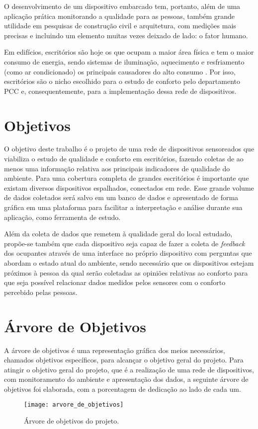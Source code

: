 \documentclass[../monografia.tex]{subfiles}
\begin{document}
O desenvolvimento de um dispositivo embarcado tem, portanto, além de uma aplicação prática monitorando a qualidade para as pessoas, também grande utilidade em pesquisas de construção civil e arquitetura, com medições mais precisas e incluindo um elemento muitas vezes deixado de lado: o fator humano.

Em edifícios, escritórios são hoje os que ocupam a maior área física e tem o maior consumo de energia, sendo sistemas de iluminação, aquecimento e resfriamento (como ar condicionado) os principais causadores do alto consumo \cite{EnergyBuildings}. Por isso, escritórios são o nicho escolhido para o estudo de conforto pelo departamento PCC e, consequentemente, para a implementação dessa rede de dispositivos. 


\section{Objetivos}

O objetivo deste trabalho é o projeto de uma rede de dispositivos sensoreados que viabiliza o estudo de qualidade e conforto em escritórios, fazendo coletas de ao menos uma informação relativa aos principais indicadores de qualidade do ambiente. Para uma cobertura completa de grandes escritórios é importante que existam diversos dispositivos espalhados, conectados em rede. Esse grande volume de dados coletados será salvo em um banco de dados e apresentado de forma gráfica em uma plataforma para facilitar a interpretação e análise durante sua aplicação, como ferramenta de estudo. 

Além da coleta de dados que remetem à qualidade geral do local estudado, propõe-se também que cada dispositivo seja capaz de fazer a coleta de \textit{feedback} dos ocupantes através de uma interface no próprio dispositivo com perguntas que abordam o estado atual do ambiente, sendo necessário que os dispositivos estejam próximos à pessoa da qual serão coletadas as opiniões relativas ao conforto para que seja possível relacionar dados medidos pelos sensores com o conforto percebido pelas pessoas.



\section{Árvore de Objetivos} 
A árvore de objetivos é uma representação gráfica dos meios necessários, chamados objetivos específicos, para alcançar o objetivo geral do projeto. 
Para atingir o objetivo geral do projeto, que é a realização de uma rede de dispositivos, com monitoramento do ambiente e apresentação dos dados, a seguinte árvore de objetivos foi elaborada, com a porcentagem de dedicação ao lado de cada um.

\begin{figure}[h!]
\texttt{[image: arvore\_de\_objetivos]}
\centering
\caption{Árvore de objetivos do projeto.}
\label{fig:objective-tree}
\end{figure}
\end{document}
